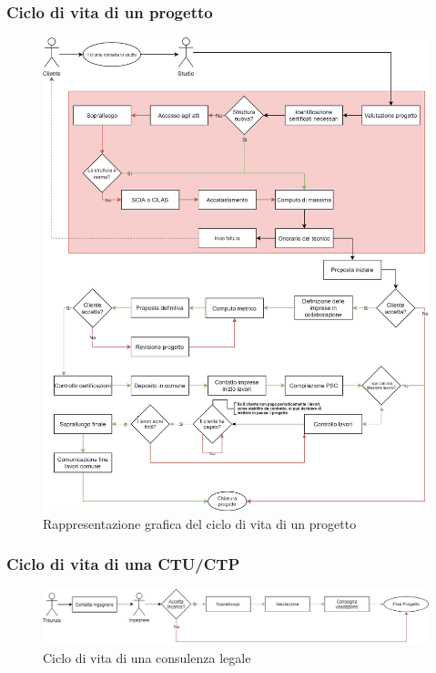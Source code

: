 \documentclass{elegantbook}
\begin{document}
	\subsubsection{Ciclo di vita di un progetto}
	\begin{figure}[H]
		\centering
		\includegraphics[scale=0.21]{../Img/Diagrams/diagram_flusso_progetto.png}
		\caption{Rappresentazione grafica del ciclo di vita di un progetto}
	\end{figure}
	\subsubsection{Ciclo di vita di una CTU/CTP}
	\begin{figure}[H]
		\centering
		\includegraphics[scale=0.3]{../Img/Diagrams/diagram_flusso_progetto_2.png}
		\caption{Ciclo di vita di una consulenza legale}
	\end{figure}
	
\end{document}

